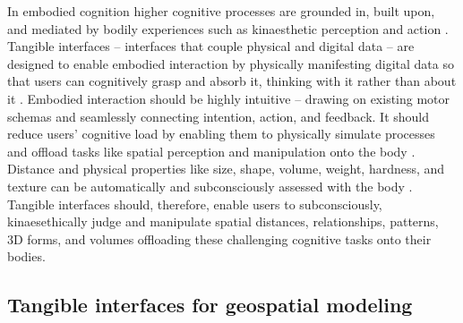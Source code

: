 \documentclass[prodmode,acmtochi]{acmsmall} %
\begin{document}
In embodied cognition higher cognitive processes are 
grounded in, built upon, and mediated by bodily experiences 
such as kinaesthetic perception and action \cite{Hardy-Vallee2008}. 
%
Tangible interfaces 
-- interfaces that couple physical and digital data \cite{Dourish2001} -- 
are designed to enable embodied interaction
by physically manifesting digital data 
so that users can cognitively grasp and absorb it,
thinking with it rather than about it \cite{Kirsh2013}. 
%
Embodied interaction should be highly intuitive --
drawing on existing motor schemas
and seamlessly connecting intention, action, and feedback.
%
It should reduce users' cognitive load 
by enabling them to
physically simulate processes 
and offload tasks like 
spatial perception and manipulation onto the body
\cite{Kirsh2013}.
%
%
Distance and physical properties 
like size, shape, volume, weight, hardness, and texture
can be automatically and subconsciously assessed 
with the body \cite{Jeannerod1997}.
Tangible interfaces should, therefore, enable users to
subconsciously, kinaesethically judge and manipulate 
spatial distances, relationships, patterns, 3D forms, and volumes
offloading these challenging cognitive tasks onto their bodies.

\subsection{Tangible interfaces for geospatial modeling} 

% 
% 


\end{document}
